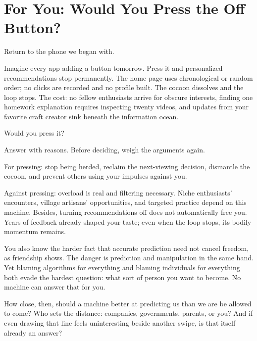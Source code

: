 \section{For You: Would You Press the Off Button?}
Return to the phone we began with.

Imagine every app adding a button tomorrow. Press it and personalized recommendations stop permanently. The home page uses chronological or random order; no clicks are recorded and no profile built. The cocoon dissolves and the loop stops. The cost: no fellow enthusiasts arrive for obscure interests, finding one homework explanation requires inspecting twenty videos, and updates from your favorite craft creator sink beneath the information ocean.

Would you press it?

Answer with reasons. Before deciding, weigh the arguments again.

For pressing: stop being herded, reclaim the next-viewing decision, dismantle the cocoon, and prevent others using your impulses against you.

Against pressing: overload is real and filtering necessary. Niche enthusiasts' encounters, village artisans' opportunities, and targeted practice depend on this machine. Besides, turning recommendations off does not automatically free you. Years of feedback already shaped your taste; even when the loop stops, its bodily momentum remains.

You also know the harder fact that accurate prediction need not cancel freedom, as friendship shows. The danger is prediction and manipulation in the same hand. Yet blaming algorithms for everything and blaming individuals for everything both evade the hardest question: what sort of person you want to become. No machine can answer that for you.

How close, then, should a machine better at predicting us than we are be allowed to come? Who sets the distance: companies, governments, parents, or you? And if even drawing that line feels uninteresting beside another swipe, is that itself already an answer?
